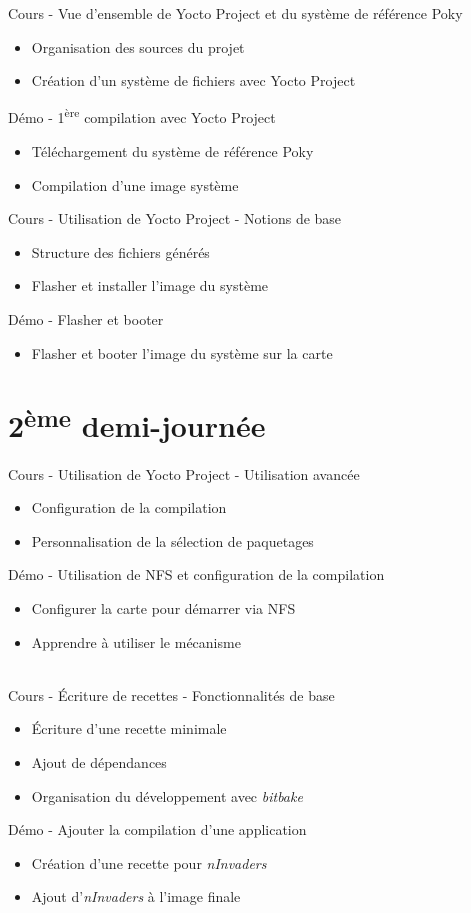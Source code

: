 \documentclass[a4paper,12pt,obeyspaces,spaces,hyphens]{article}
\begin{document}
\feagendatwocolumn
{Cours - Vue d'ensemble de Yocto Project et du système de référence Poky}
{
  \begin{itemize}
  \item Organisation des sources du projet
  \item Création d'un système de fichiers avec Yocto Project
  \end{itemize}
}
{Démo - 1\textsuperscript{ère} compilation avec Yocto Project}
{
  \begin{itemize}
  \item Téléchargement du système de référence Poky
  \item Compilation d'une image système
 \end{itemize}
}

\newpage
\feagendatwocolumn
{Cours - Utilisation de Yocto Project - Notions de base}
{
  \begin{itemize}
  \item Structure des fichiers générés
  \item Flasher et installer l'image du système
  \end{itemize}
}
{Démo - Flasher et booter}
{
  \begin{itemize}
  \item Flasher et booter l'image du système sur la carte
  \end{itemize}
}

\section{2\textsuperscript{ème} demi-journée}

\feagendatwocolumn
{Cours - Utilisation de Yocto Project - Utilisation avancée}
{
  \begin{itemize}
  \item Configuration de la compilation
  \item Personnalisation de la sélection de paquetages
  \end{itemize}
}
{Démo - Utilisation de NFS et configuration de la compilation}
{
  \begin{itemize}
  \item Configurer la carte pour démarrer via NFS
  \item Apprendre à utiliser le mécanisme 
  \end{itemize}
}
\\

\feagendatwocolumn
{Cours - Écriture de recettes - Fonctionnalités de base}
{
  \begin{itemize}
  \item Écriture d'une recette minimale
  \item Ajout de dépendances
  \item Organisation du développement avec {\em bitbake}
  \end{itemize}
}
{Démo - Ajouter la compilation d'une application}
{
  \begin{itemize}
  \item Création d'une recette pour {\em nInvaders}
  \item Ajout d'{\em nInvaders} à l'image finale
  \end{itemize}
}
\end{document}
